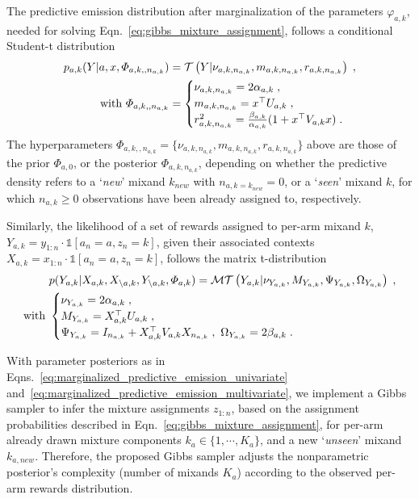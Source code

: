 The predictive emission distribution after marginalization of the parameters $\varphi_{a,k}$, needed for solving Eqn.~\eqref{eq:gibbs_mixture_assignment}, follows a conditional Student-t distribution
\begin{align}
p_{a,k}(Y|a,x,\varPhi_{a,k,,n_{a,k}}) &= \mathcal{T}\left( Y|\nu_{a,k,n_{a,k}}, m_{a,k,n_{a,k}}, r_{a,k,n_{a,k}}\right) \;, \nonumber \\
\text{with } \varPhi_{a,k,,n_{a,k}} &=
\begin{cases}
\nu_{a,k,n_{a,k}}=2\alpha_{a,k} \;, \\
m_{a,k,n_{a,k}} = x^\top U_{a,k} \;, \\
r_{a,k,n_{a,k}}^2 = \frac{\beta_{a,k}}{\alpha_{a,k}} (1+x^\top V_{a,k} x) \;.
\end{cases}
\label{eq:marginalized_predictive_emission_univariate}
\end{align}
The hyperparameters $\varPhi_{a,k,,n_{a,k}}=\{\nu_{a,k,n_{a,k}}, m_{a,k,n_{a,k}}, r_{a,k,n_{a,k}}\}$ above are those of the prior $\varPhi_{a,0}$, or the posterior $\varPhi_{a,k,n_{a,k}}$, depending on whether the predictive density refers to a `\textit{new}' mixand $k_{new}$ with $n_{a,k=k_{new}}=0$, or a `\textit{seen}' mixand $k$, for which $n_{a,k}\geq0$ observations have been already assigned to, respectively.

Similarly, the likelihood of a set of rewards assigned to per-arm mixand $k$, $Y_{a,k}=y_{1:n}\cdot \mathds{1}[a_n=a,z_n=k]$, given their associated contexts $X_{a,k}=x_{1:n} \cdot \mathds{1}[a_n=a,z_n=k]$, follows the matrix t-distribution
\begin{align}
&p(Y_{a,k}|X_{a,k},X_{\backslash a,k},Y_{\backslash a,k},\varPhi_{a,k}) = \mathcal{MT}\left( Y_{a,k}|\nu_{Y_{a,k}}, M_{Y_{a,k}}, \Psi_{Y_{a,k}}, \Omega_{Y_{a,k}}\right) \; , \nonumber  \\
\text{with }&\begin{cases}
\nu_{Y_{a,k}}=2 \alpha_{a,k} \;,\\
M_{Y_{a,k}}= X_{a,k}^\top U_{a,k} \;, \\
\Psi_{Y_{a,k}} = I_{n_{a,k}} + X_{a,k}^\top V_{a,k} X_{n_{a,k}} \;,\
\Omega_{Y_{a,k}} = 2 \beta_{a,k} \;.
\end{cases}
\label{eq:marginalized_predictive_emission_multivariate}
\end{align}

With parameter posteriors as in Eqns.~\eqref{eq:marginalized_predictive_emission_univariate} and~\eqref{eq:marginalized_predictive_emission_multivariate}, we implement a Gibbs sampler to infer the mixture assignments $z_{1:n}$, based on the assignment probabilities described in Eqn.~\eqref{eq:gibbs_mixture_assignment}, for per-arm already drawn mixture components $k_a\in\{1, \cdots, K_a\}$, and a new `\textit{unseen}' mixand $k_{a,new}$. Therefore, the proposed Gibbs sampler adjusts the nonparametric posterior's complexity (\ie number of mixands $K_a$) according to the observed per-arm rewards distribution.

